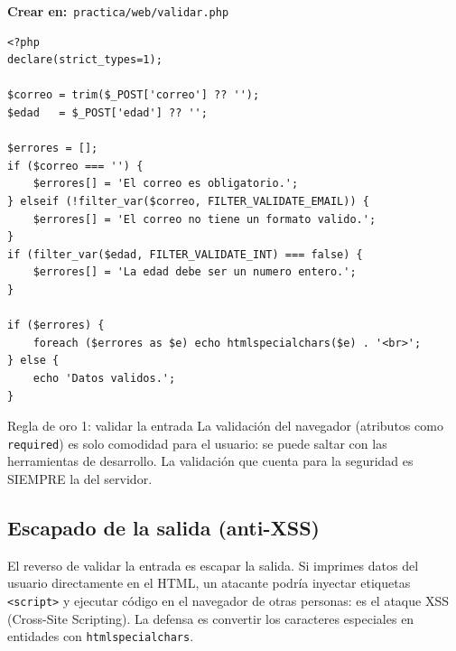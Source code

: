 \documentclass[11pt]{article}
\begin{document}
{\small\color{phpazulo}\textbf{Crear en:}~}\texttt{practica/\allowbreak{}web/\allowbreak{}validar.\allowbreak{}php}\par\nobreak\vspace{-1pt}
\begin{cajacodigo}
\begin{lstlisting}[style=php]
<?php
declare(strict_types=1);

$correo = trim($_POST['correo'] ?? '');
$edad   = $_POST['edad'] ?? '';

$errores = [];
if ($correo === '') {
    $errores[] = 'El correo es obligatorio.';
} elseif (!filter_var($correo, FILTER_VALIDATE_EMAIL)) {
    $errores[] = 'El correo no tiene un formato valido.';
}
if (filter_var($edad, FILTER_VALIDATE_INT) === false) {
    $errores[] = 'La edad debe ser un numero entero.';
}

if ($errores) {
    foreach ($errores as $e) echo htmlspecialchars($e) . '<br>';
} else {
    echo 'Datos validos.';
}
\end{lstlisting}
\end{cajacodigo}
\vspace{2pt}
\begin{cajatip}{Regla de oro 1: validar la entrada}
La validación del navegador (atributos como \texttt{required}) es solo comodidad para el usuario: se puede saltar con las herramientas de desarrollo. La validación que cuenta para la seguridad es SIEMPRE la del servidor.\par
\end{cajatip}
\subsection{Escapado de la salida (anti-XSS)}
El reverso de validar la entrada es escapar la salida. Si imprimes datos del usuario directamente en el HTML, un atacante podría inyectar etiquetas \texttt{\textless{}script\textgreater{}} y ejecutar código en el navegador de otras personas: es el ataque XSS (Cross-Site Scripting). La defensa es convertir los caracteres especiales en entidades con \texttt{htmlspecialchars}.
\end{document}
